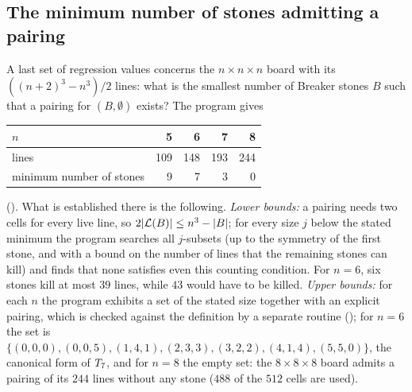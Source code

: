 \subsection{The minimum number of stones admitting a pairing}\label{ssec:fmt-minstones}

A last set of regression values concerns the $n\times n\times n$ board with its $((n+2)^3-n^3)/2$ lines:
what is the smallest number of Breaker stones $B$ such that a pairing for $(B,\emptyset)$ exists? The
program  gives
\begin{center}\small
\begin{tabular}{@{}lrrrr@{}}
\toprule
$n$ & 5 & 6 & 7 & 8\\
\midrule
lines & 109 & 148 & 193 & 244\\
minimum number of stones & 9 & 7 & 3 & 0\\
\bottomrule
\end{tabular}
\end{center}
(). What is established there is the following. \emph{Lower
bounds:} a pairing needs two cells for every live line, so $2|\mathcal{L}(B)|\le n^3-|B|$; for every size $j$
below the stated minimum the program searches all $j$-subsets (up to the symmetry of the first stone,
and with a bound on the number of lines that the remaining stones can kill) and finds that none satisfies
even this counting condition. For $n=6$, six stones kill at most $39$ lines, while $43$ would have to be
killed. \emph{Upper bounds:} for each $n$ the program exhibits a set of the stated size together with an
explicit pairing, which is checked against the definition by a separate routine
(); for $n=6$ the set is
$\{(0,0,0),(0,0,5),(1,4,1),(2,3,3),(3,2,2),(4,1,4),(5,5,0)\}$, the canonical form of $T_7$, and for $n=8$
the empty set: the $8\times8\times8$ board admits a pairing of its $244$ lines without any stone ($488$ of
the $512$ cells are used).
